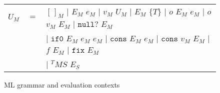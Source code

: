 \begin{figure}[p]
\begin{tabular}{lcl}
\vspace{5pt}

$U_{M}$ & $=$ & $[\,]_{M}$ $\vert$ $E_{M}$ $e_{M}$ $\vert$ $v_{M}$ $U_{M}$ $\vert$ $E_{M}$ $\lbrace T\rbrace$ $\vert$ $o$ $E_{M}$ $e_{M}$ $\vert$ $o$ $v_{M}$ $E_{M}$ $\vert$ $\mathtt{null?}$ $E_{M}$ \\

\vspace{5pt}

&& $\vert$ $\mathtt{if0}$ $E_{M}$ $e_{M}$ $e_{M}$ $\vert$ $\mathtt{cons}$ $E_{M}$ $e_{M}$ $\vert$ $\mathtt{cons}$ $v_{M}$ $E_{M}$ $\vert$ $f$ $E_{M}$ $\vert$ $\mathtt{fix}$ $E_{M}$ \\

\vspace{5pt}

&& $\vert$ $^{T}MS$ $E_{S}$
\end{tabular}
\caption{ML grammar and evaluation contexts}
\label{mg}
\end{figure}